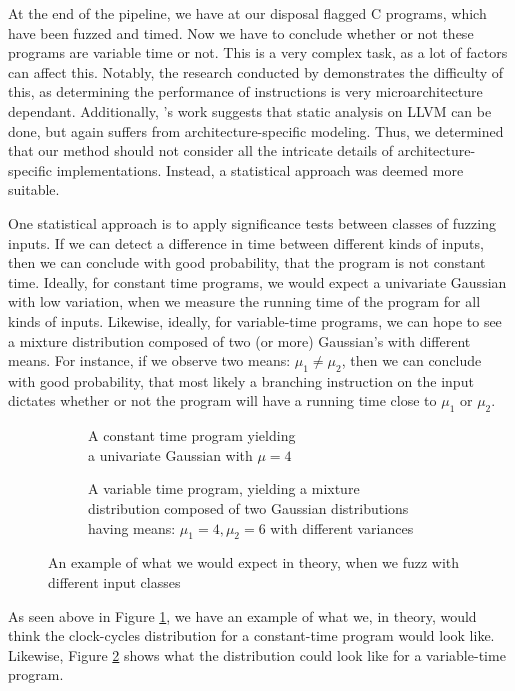 \label{sec:statistical-analysis}
At the end of the pipeline, we have at our disposal flagged C programs, which have been fuzzed and timed. Now we have to conclude whether or not these programs are variable time or not. This is a very complex task, as a lot of factors can affect this. Notably, the research conducted by \citeauthor{Abel19a} demonstrates the difficulty of this, as determining the performance of instructions is very microarchitecture dependant. Additionally, \cite{Almeida16}'s work suggests that static analysis on LLVM can be done, but again suffers from architecture-specific modeling. Thus, we determined that our method should not consider all the intricate details of architecture-specific implementations. Instead, a statistical approach was deemed more suitable.

One statistical approach is to apply significance tests between classes of fuzzing inputs. If we can detect a difference in time between different kinds of inputs, then we can conclude with good probability, that the program is not constant time. Ideally, for constant time programs, we would expect a univariate Gaussian with low variation, when we measure the running time of the program for all kinds of inputs. Likewise, ideally, for variable-time programs, we can hope to see a mixture distribution composed of two (or more) Gaussian's with different means. For instance, if we observe two means: $\mu_1 \neq \mu_2$, then we can conclude with good probability, that most likely a branching instruction on the input dictates whether or not the program will have a running time close to $\mu_1$ or $\mu_2$.


\def\gausssolution{5.170045172}
\begin{figure}[H]
\captionsetup[subfigure]{justification=centering}
\begin{subfigure}[t]{0.50\textwidth}
\resizebox{\linewidth}{!}{
    
}%
\caption{A constant time program yielding\\a univariate Gaussian with $\mu = 4$}
\label{fig:univargauss}
\end{subfigure}
\begin{subfigure}[t]{0.50\textwidth}
\resizebox{\linewidth}{!}{
    
}%
\caption{A variable time program, yielding a mixture\\distribution composed of two Gaussian distributions\\having means: $\mu_1 = 4, \mu_2 = 6$ with different variances}
\label{fig:mixdisgauss}
\end{subfigure}
\caption{An example of what we would expect in theory, when we fuzz with different input classes}
\label{fig:fuzzclass-statistics-example}
\end{figure}
As seen above in Figure \ref{fig:univargauss}, we have an example of what we, in theory, would think the clock-cycles distribution for a constant-time program would look like. Likewise, Figure \ref{fig:mixdisgauss} shows what the distribution could look like for a variable-time program.

